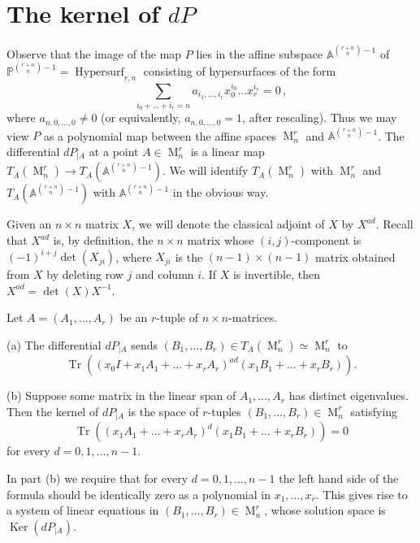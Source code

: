 \documentclass[12pt]{amsart}
\numberwithin{equation}{section}
\numberwithin{subsection}{section}
\theoremstyle{definition} \newtheorem{definition}[theorem]{Definition}
\newcommand\Hypersurf{\operatorname{Hypersurf}}
\newcommand\Ker{\operatorname{Ker}}
\newcommand{\tr}{\operatorname{Tr}}
\newcommand{\Mat}{\operatorname{M}}
\newcommand{\bbP}{\mathbb{P}}
\newcommand{\bbA}{\mathbb{A}}
\begin{document}
\section{The kernel of $dP$}
\label{sect.tangent-space}

Observe that the image of the map $P$ lies in the affine subspace 
$\bbA^{\binom{r + n}{n} - 1}$ of $\bbP^{\binom{r + n}{n} - 1} = 
\Hypersurf_{r, n}$ consisting of hypersurfaces of 
the form 
\[ \sum_{i_0 + \dots + i_r = n} 
a_{i_1, \ldots, i_r} x_0^{i_0} \dots x_r^{i_r} = 0 \, ,  \]
where $a_{n, 0, \ldots, 0} \neq 0$ (or equivalently,
$a_{n, 0, \ldots, 0} = 1$, after rescaling). Thus we may view
$P$ as a polynomial map between the affine spaces $\Mat_n^r$ and 
$\bbA^{\binom{r + n}{n} - 1}$. The differential $dP_{|A}$ 
at a point $A \in \Mat_n^r$ is a linear map 
$T_A(\Mat_n^r) \to T_A(\bbA^{\binom{r + n}{n} - 1})$. We will identify
$T_A(\Mat_n^r)$ with $\Mat_n^r$ and $T_A(\bbA^{\binom{r + n}{n} - 1})$ with
$\bbA^{\binom{r + n}{n} - 1}$ in the obvious way.

Given an $n \times n$ matrix $X$, we will denote the classical
adjoint of $X$ by $X^{ad}$. Recall that $X^{ad}$ is, by definition,
the $n \times n$ matrix whose $(i,j)$-component is
$(-1)^{i + j} \det(X_{ji})$, where $X_{ji}$
is the $(n-1) \times (n-1)$ matrix obtained from $X$ by deleting 
row $j$ and column $i$.  If $X$ is invertible, then 
$X^{ad} = \det(X) X^{-1}$. 

\begin{lemma} \label{lem.differential}
Let $A = (A_1, \dots, A_r)$ be an $r$-tuple of $n \times n$-matrices.

\smallskip
(a) The differential $dP_{|A}$ sends 
$(B_1, \dots, B_r) \in T_A(\Mat_n^r) \simeq \Mat_n^r$ 
to 
\[ \tr( (x_0 I + x_1 A_1 + \dots + x_r A_r)^{ad} 
(x_1 B_1 + \dots + x_r B_r) ). \]

\smallskip
(b) Suppose some matrix in the linear span of 
$A_1, \dots, A_r$ has distinct eigenvalues. Then
the kernel of $dP_{|A}$ is the space of 
$r$-tuples $(B_1, \dots, B_r) \in \Mat_n^r$ satisfying
\[ \tr( (x_1 A_1 + \dots + x_r A_r)^d 
(x_1 B_1 + \dots + x_r B_r) )= 0 \]
for every $d = 0, 1, \dots, n - 1$. 
\end{lemma}

In part (b) we require that for every $d = 0, 1, \dots, n-1$ 
the left hand side of the 
formula should be identically zero as a polynomial in $x_1, \dots, x_r$.  
This gives rise to a system of linear equations
in $(B_1, \dots, B_r) \in \Mat_n^r$, whose solution space is $\Ker(dP_{|A})$.
\end{document}
